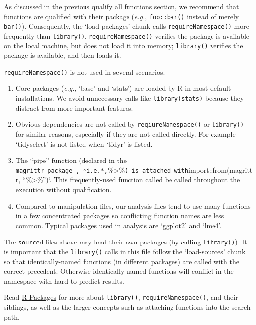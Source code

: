 \documentclass[]{book}
\providecommand{\tightlist}{%
  \setlength{\itemsep}{0pt}\setlength{\parskip}{0pt}}
\begin{document}
As discussed in the previous \protect\hyperlink{qualify-functions}{qualify all functions} section, we recommend that functions are qualified with their package (\emph{e.g.}, \texttt{foo::bar()} instead of merely \texttt{bar()}). Consequently, the `load-packages' chunk calls \texttt{requireNamespace()} more frequently than \texttt{library()}. \texttt{requireNamespace()} verifies the package is available on the local machine, but does not load it into memory; \texttt{library()} verifies the package is available, and then loads it.

\texttt{requireNamespace()} is not used in several scenarios.

\begin{enumerate}
\def\labelenumi{\arabic{enumi}.}
\tightlist
\item
  Core packages (\emph{e.g.}, `base' and `stats') are loaded by R in most default installations. We avoid unnecessary calls like \texttt{library(stats)} because they distract from more important features.
\item
  Obvious dependencies are not called by \texttt{reqiureNamespace()} or \texttt{library()} for similar reasons, especially if they are not called directly. For example `tidyselect' is not listed when `tidyr' is listed.
\item
  The ``pipe'' function (declared in the \texttt{magrittr\textquotesingle{}\ package\ ,\ *i.e.*,}\%\textgreater{}\%\texttt{)\ is\ attached\ with}import::from(magrittr, ``\%\textgreater{}\%'')`. This frequently-used function called be called throughout the execution without qualification.
\item
  Compared to manipulation files, our analysis files tend to use many functions in a few concentrated packages so conflicting function names are less common. Typical packages used in analysis are `ggplot2' and `lme4'.
\end{enumerate}

The \texttt{source}d files above may load their own packages (by calling \texttt{library()}). It is important that the \texttt{library()} calls in this file follow the `load-sources' chunk so that identically-named functions (in different packages) are called with the correct precedent. Otherwise identically-named functions will conflict in the namespace with hard-to-predict results.

Read \href{http://r-pkgs.had.co.nz/namespace.html\#search-path}{R Packages} for more about \texttt{library()}, \texttt{requireNamespace()}, and their siblings, as well as the larger concepts such as attaching functions into the search path.
\end{document}
